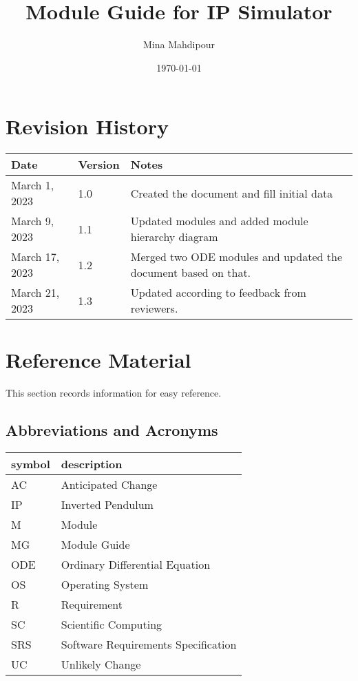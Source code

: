 \documentclass[12pt, titlepage]{article}
\begin{document}
\title{Module Guide for IP Simulator} 
\author{Mina Mahdipour}
\date{\today}

\maketitle


\section{Revision History}

\begin{tabularx}{\textwidth}{p{3cm}p{2cm}X}
\toprule {\bf Date} & {\bf Version} & {\bf Notes}\\
\midrule
March 1, 2023 & 1.0 & Created the document and fill initial data\\
March 9, 2023 & 1.1 & Updated modules and added module hierarchy diagram\\
March 17, 2023 & 1.2 & Merged two ODE modules and updated the document based on that.\\
March 21, 2023 & 1.3 & Updated according to feedback from reviewers.\\
\bottomrule
\end{tabularx}

\newpage

\section{Reference Material}

This section records information for easy reference.

\subsection{Abbreviations and Acronyms}

\renewcommand{\arraystretch}{1.2}
\begin{tabular}{l l} 
  \toprule		
  \textbf{symbol} & \textbf{description}\\
  \midrule 
  AC & Anticipated Change\\
  IP & Inverted Pendulum\\
  M & Module \\
  MG & Module Guide \\
  ODE & Ordinary Differential Equation\\
  OS & Operating System \\
  R & Requirement\\
  SC & Scientific Computing \\
  SRS & Software Requirements Specification\\
  UC & Unlikely Change \\

  \bottomrule
\end{tabular}\\
\end{document}
